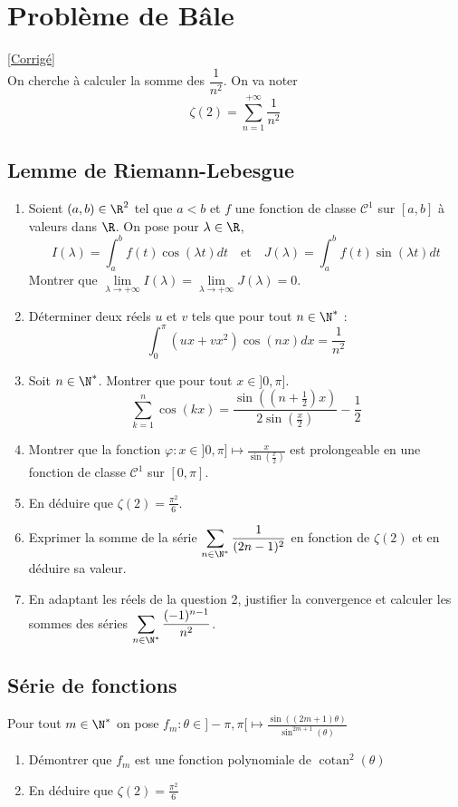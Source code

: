 \documentclass{book}
\begin{document}
	\section{Problème de Bâle}
	\label{Problème de Bâle}
	\textcolor{blue}{\hyperref[sec:probleme-de-bale]{[Corrigé]}}\\
	On cherche à calculer la somme des $\dfrac{1}{n^2}$. On va noter \[\zeta(2)=\sum_{n=1}^{+\infty}\frac{1}{n^2}\]
	\subsection{Lemme de Riemann-Lebesgue}
	\begin{enumerate}[leftmargin=*]
		\item Soient $(a,b)\in \R^2$ tel que $a<b$ et $f$ une fonction de classe $\mathcal C^1$ sur $[a,b]$ à valeurs dans $\R$. On pose pour $\lambda\in \R$,
		$$I(\lambda)=\int_a^bf(t)\cos(\lambda t)dt\quad \text{et}\quad J(\lambda)=\int_a^bf(t)\sin(\lambda t)dt$$
		Montrer que $\lim\limits_{\lambda\to +\infty}I(\lambda)=\lim\limits_{\lambda\to +\infty}J(\lambda)=0$.
		\item Déterminer deux réels $u$ et $v$ tels que pour tout $n\in \N^*$ :
		$$\int_0^\pi(ux+vx^2)\cos(nx)dx=\frac{1}{n^2}$$
		\item Soit $n\in\N^*$.  Montrer que pour tout $x\in]0,\pi]$.
		\[\sum_{k=1}^{n}\cos(kx)=\frac{\sin\left(\left(n+\frac{1}{2}\right)x\right)}{2\sin\left(\frac{x}{2}\right)}-\frac{1}{2}\]
		\item Montrer que la fonction $\varphi:x\in ]0,\pi]\mapsto\displaystyle\frac{x}{\sin\left(\frac{x}{2}\right)}$ est prolongeable en une fonction de classe $\mathcal C^1$ sur $[0,\pi]$.
		\item En déduire que $\zeta(2)=\displaystyle\frac{\pi^2}{6}$.
		\item Exprimer la somme de la série $\displaystyle\sum_{n\in \N^*}\frac{1}{(2n-1)^2}$ en fonction de $\zeta(2)$ et en déduire sa valeur.
		\item En adaptant les réels de la question 2, justifier la convergence et calculer les sommes des séries $\displaystyle\sum_{n\in \N^*}\frac{(-1)^{n-1}}{n^2}$.
	\end{enumerate}
	
	\subsection{Série de fonctions }
	Pour tout $m\in \N^*$ on pose $f_m:\theta \in ]-\pi,\pi[ \displaystyle\longmapsto\frac{\sin((2m+1)\theta)}{\sin^{2m+1}(\theta)}$
	\begin{enumerate}
		\item Démontrer que $f_m$ est une fonction polynomiale de $ \operatorname{cotan}^2(\theta) $
		\item En déduire que $\zeta(2)=\displaystyle\frac{\pi^2}{6}$
	\end{enumerate}
\end{document}
